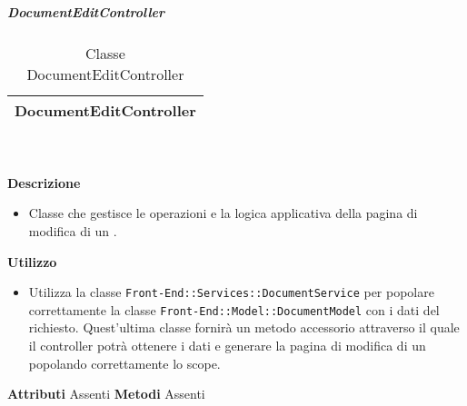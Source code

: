 			\subparagraph{DocumentEditController} 
\begin{table}[ht]
\begin{center}
\bgroup
	\setlength{\arrayrulewidth}{0.6mm}
	\def\arraystretch{1}
		\begin{tabular}{ | p{12cm} | }
				\hline  
					\centerline{\textbf{DocumentEditController}}
		\\ \hline 
				\hline
				\hline
		
		\end{tabular}
\egroup
\caption{Classe DocumentEditController}
\end{center}
\end{table} \textbf{\\ \\ Descrizione}
\begin{itemize}
\item[] Classe che gestisce le operazioni e la logica applicativa della pagina di modifica di un .
\end{itemize} 
\textbf{Utilizzo}
\begin{itemize}
\item[] Utilizza la classe \texttt{Front-End::Services::DocumentService} per popolare correttamente la classe \texttt{Front-End::Model::DocumentModel} con i dati del  richiesto. Quest'ultima classe fornirà un metodo accessorio attraverso il quale il controller potrà ottenere i dati e generare la pagina di modifica di un  popolando correttamente lo scope.
\end{itemize}
\textbf{Attributi}
Assenti
\textbf{Metodi}
Assenti

